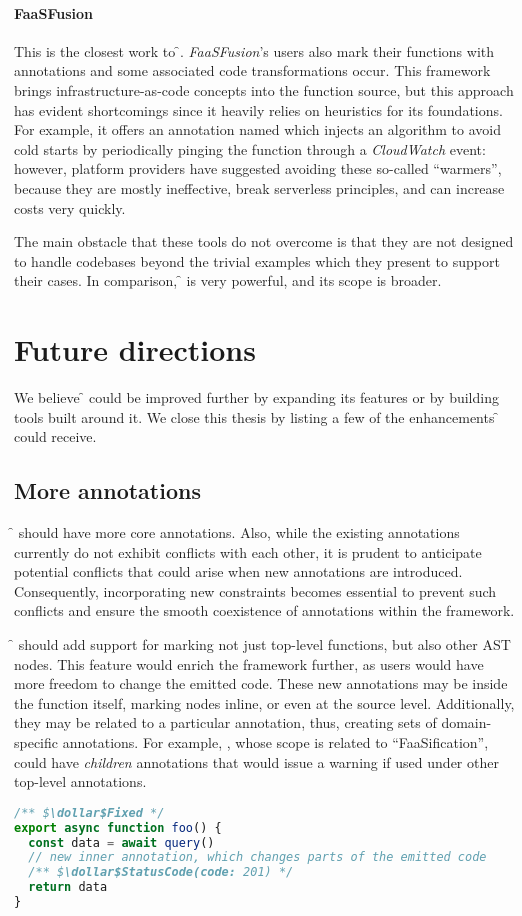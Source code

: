 \paragraph{\textbf{FaaSFusion} \cite{faasfusion}}
This is the closest work to \f{}.
\textit{FaaSFusion}'s users also mark their functions with annotations
and some associated code transformations occur.
This framework brings infrastructure-as-code concepts into the function source,
but this approach has evident shortcomings since it heavily relies on heuristics for its foundations.
For example, it offers an annotation named  which
injects an algorithm to avoid cold starts by periodically pinging the function
through a \textit{CloudWatch} event:
however, platform providers have suggested avoiding these so-called ``warmers'',
because they are mostly ineffective, break serverless principles, and can increase costs very quickly.

The main obstacle that these tools do not overcome is that they are
not designed to handle codebases beyond the trivial examples
which they present to support their cases.
In comparison, \f{} is very powerful, and its scope is broader.

\section{Future directions}

We believe \f{} could be improved further by expanding its features
or by building tools built around it.
We close this thesis by listing a few of the enhancements \f{} could receive.

\subsection{More annotations}

\f{} should have more core annotations.
Also, while the existing annotations currently do not exhibit conflicts with each other,
it is prudent to anticipate potential conflicts that could arise when new annotations are introduced.
Consequently, incorporating new constraints becomes essential to prevent such
conflicts and ensure the smooth coexistence of annotations within the framework.

\f{} should add support for marking not just top-level functions, but also other AST nodes.
This feature would enrich the framework further, as users would have more freedom
to change the emitted code. These new annotations may be inside the function itself,
marking nodes inline, or even at the source level. Additionally, they may be related to a particular annotation,
thus, creating sets of domain-specific annotations.
For example, , whose scope is related to ``FaaSification'',
could have \textit{children} annotations that would issue a warning if used under other top-level annotations.
\begin{lstlisting}[language=javascript]
/** $\dollar$Fixed */
export async function foo() {
  const data = await query()
  // new inner annotation, which changes parts of the emitted code
  /** $\dollar$StatusCode(code: 201) */
  return data
}
\end{lstlisting}

